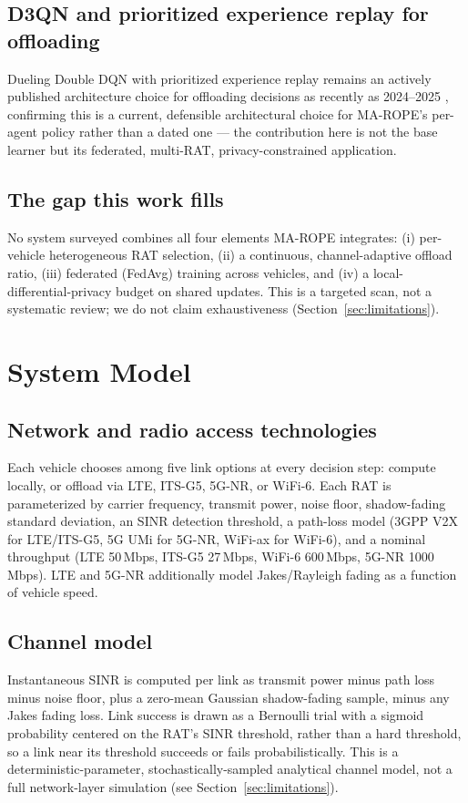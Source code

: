 \documentclass[journal,10pt,twocolumn]{IEEEtran}
\begin{document}
\subsection{D3QN and prioritized experience replay for offloading}
Dueling Double DQN with prioritized experience replay remains an actively published architecture
choice for offloading decisions as recently as 2024--2025 \cite{pd3qn2024}, confirming this is a
current, defensible architectural choice for MA-ROPE's per-agent policy rather than a dated one ---
the contribution here is not the base learner but its federated, multi-RAT, privacy-constrained
application.

\subsection{The gap this work fills}
No system surveyed combines all four elements MA-ROPE integrates: (i) per-vehicle heterogeneous
RAT selection, (ii) a continuous, channel-adaptive offload ratio, (iii) federated (FedAvg) training
across vehicles, and (iv) a local-differential-privacy budget on shared updates. This is a targeted
scan, not a systematic review; we do not claim exhaustiveness (Section~\ref{sec:limitations}).

\section{System Model}
\label{sec:sysmodel}

\subsection{Network and radio access technologies}
Each vehicle chooses among five link options at every decision step: compute locally, or offload
via LTE, ITS-G5, 5G-NR, or WiFi-6. Each RAT is parameterized by carrier frequency, transmit power,
noise floor, shadow-fading standard deviation, an SINR detection threshold, a path-loss model
(3GPP V2X for LTE/ITS-G5, 5G UMi for 5G-NR, WiFi-ax for WiFi-6), and a nominal throughput (LTE
50\,Mbps, ITS-G5 27\,Mbps, WiFi-6 600\,Mbps, 5G-NR 1000\,Mbps). LTE and 5G-NR additionally model
Jakes/Rayleigh fading as a function of vehicle speed.

\subsection{Channel model}
Instantaneous SINR is computed per link as transmit power minus path loss minus noise floor, plus
a zero-mean Gaussian shadow-fading sample, minus any Jakes fading loss. Link success is drawn as a
Bernoulli trial with a sigmoid probability centered on the RAT's SINR threshold, rather than a hard
threshold, so a link near its threshold succeeds or fails probabilistically. This is a
deterministic-parameter, stochastically-sampled analytical channel model, not a full network-layer
simulation (see Section~\ref{sec:limitations}).
\end{document}
